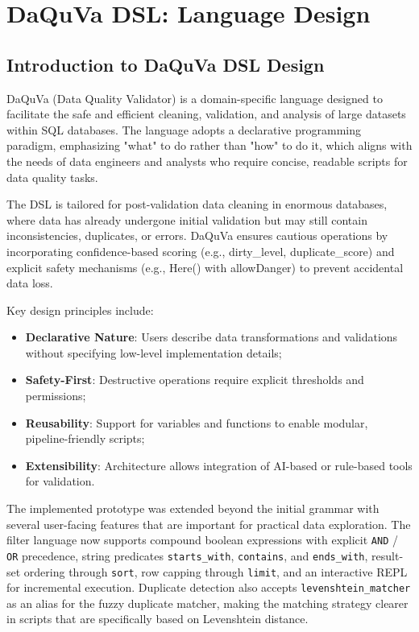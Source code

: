\chapter{DaQuVa DSL: Language Design}

\section{Introduction to DaQuVa DSL Design}
DaQuVa (Data Quality Validator) is a domain-specific language designed to facilitate the safe and efficient cleaning, validation, and analysis of large datasets within SQL databases. The language adopts a declarative programming paradigm, emphasizing "what" to do rather than "how" to do it, which aligns with the needs of data engineers and analysts who require concise, readable scripts for data quality tasks.

The DSL is tailored for post-validation data cleaning in enormous databases, where data has already undergone initial validation but may still contain inconsistencies, duplicates, or errors. DaQuVa ensures cautious operations by incorporating confidence-based scoring (e.g., dirty\_level, duplicate\_score) and explicit safety mechanisms (e.g., Here() with allowDanger) to prevent accidental data loss.

Key design principles include:
\begin{itemize}[label=-, noitemsep]
    \item \textbf{Declarative Nature}: Users describe data transformations and validations without specifying low-level implementation details;
    \item \textbf{Safety-First}: Destructive operations require explicit thresholds and permissions;
    \item \textbf{Reusability}: Support for variables and functions to enable modular, pipeline-friendly scripts;
    \item \textbf{Extensibility}: Architecture allows integration of AI-based or rule-based tools for validation.
\end{itemize}

The implemented prototype was extended beyond the initial grammar with several
user-facing features that are important for practical data exploration. The
filter language now supports compound boolean expressions with explicit
\texttt{AND} / \texttt{OR} precedence, string predicates
\texttt{starts\_with}, \texttt{contains}, and \texttt{ends\_with}, result-set
ordering through \texttt{sort}, row capping through \texttt{limit}, and an
interactive REPL for incremental execution. Duplicate detection also accepts
\texttt{levenshtein\_matcher} as an alias for the fuzzy duplicate matcher,
making the matching strategy clearer in scripts that are specifically based on
Levenshtein distance.

